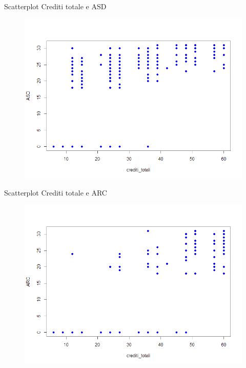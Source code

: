 \documentclass{beamer}
\begin{document}
\begin{frame}{Scatterplot Crediti totale e ASD}
    \begin{figure}[bt]
      \begin{center}
        \includegraphics[width=\textwidth]{../img/creditiAsd.png}
      \end{center}
    \end{figure}
  \end{frame}

  \begin{frame}{Scatterplot Crediti totale e ARC}
    \begin{figure}[bt]
      \begin{center}
        \includegraphics[width=\textwidth]{../img/creditiArc.png}
      \end{center}
    \end{figure}
  \end{frame}
\end{document}

